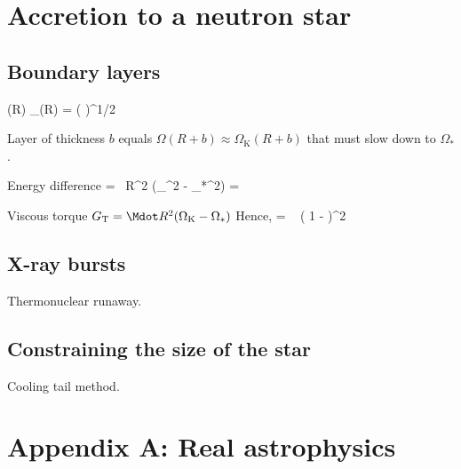 \section{Accretion to a neutron star}

\subsection{Boundary layers}

\be
\Omega(R) \approx \Omega_{}(R) = \left(  \right)^{1/2}
\ee

Layer of thickness $b$ equals $\Omega(R + b) \approx \Omega_{\mathrm{K}}(R + b)$ that must slow down to $\Omega_{*}$.

Energy difference
\be
{} =  \Mdot R^2 (\Omega_{}^2 - \Omega_{*}^2) = 
 \Mdot {}  
\ee

Viscous torque $G_{\mathrm{T}} = \Mdot R^2 (\Omega_{\mathrm{K}} - \Omega_*)$
Hence,
\be
{} =   \left( 1 -  \right)^2
\ee


\subsection{X-ray bursts}
Thermonuclear runaway.

\subsection{Constraining the size of the star}
Cooling tail method.





\newpage
\section{Appendix A: Real astrophysics}

